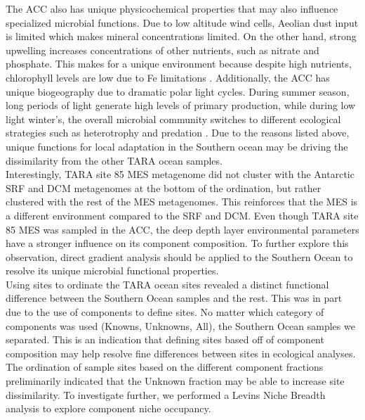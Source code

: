 The ACC also has unique physicochemical properties that may also influence specialized microbial functions. Due to low altitude wind cells, Aeolian dust input is limited which makes mineral concentrations limited. On the other hand, strong upwelling increases concentrations of other nutrients, such as nitrate and phosphate. This makes for a unique environment because despite high nutrients, chlorophyll levels are low due to Fe limitations \citep{Martin_1990, Tagliabue_2014, Cavicchioli_2015}. Additionally, the ACC has unique biogeography due to dramatic polar light cycles. During summer season, long periods of light generate high levels of primary production, while during low light winter's, the overall microbial community switches to different ecological strategies such as heterotrophy and predation \citep{Wilkins_2013, Milici_2017}. Due to the reasons listed above, unique functions for local adaptation in the Southern ocean may be driving the dissimilarity from the other TARA ocean samples.\\

Interestingly, TARA site 85 MES metagenome did not cluster with the Antarctic SRF and DCM metagenomes at the bottom of the ordination, but rather clustered with the rest of the MES metagenomes. This reinforces that the MES is a different environment compared to the SRF and DCM. Even though TARA site 85 MES was sampled in the ACC, the deep depth layer environmental parameters have a stronger influence on its component composition. To further explore this observation, direct gradient analysis should be applied to the Southern Ocean to resolve its unique microbial functional properties.\\

Using sites to ordinate the TARA ocean sites revealed a distinct functional difference between the Southern Ocean samples and the rest. This was in part due to the use of components to define sites. No matter which category of components was used (Knowns, Unknowns, All), the Southern Ocean samples we separated. This is an indication that defining sites based off of component composition may help resolve fine differences between sites in ecological analyses. \\

The ordination of sample sites based on the different component fractions preliminarily indicated that the Unknown fraction may be able to increase site dissimilarity. To investigate further, we performed a Levin\textquotesingle s Niche Breadth analysis to explore component niche occupancy.\\

